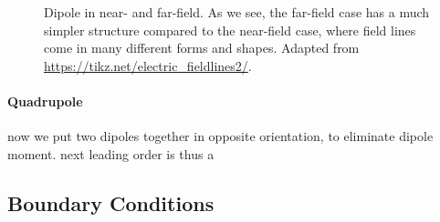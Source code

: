 \documentclass[../class_mech_main.tex]{subfiles}
\begin{document}
\begin{figure}
    \centering

    \hspace*{0.2\textwidth}%

    \caption{Dipole in near- and far-field. As we see, the far-field case has a much simpler structure compared to the near-field case, where field lines come in many different forms and shapes. Adapted from \url{https://tikz.net/electric_fieldlines2/}.}
    \label{fig:dipoles}
\end{figure}



            \paragraph{Quadrupole}
now we put two dipoles together in opposite orientation, to eliminate dipole moment. next leading order is thus a 



        \subsection{Boundary Conditions}
\end{document}
